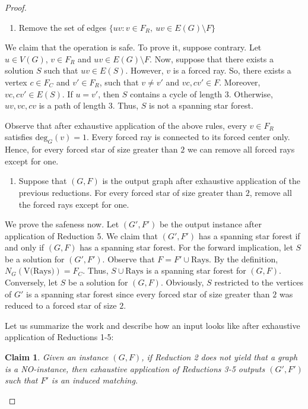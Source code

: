 \documentclass[en]{pracamgr}
\newtheorem{claim}{Claim}
\theoremstyle{definition}
\newcommand{\ssf}{spanning star forest}
\newcommand{\degree}[2]{\textrm{deg}_{#1}(#2)}
\begin{document}
\begin{proof}
	\begin{enumerate}[leftmargin=*,label=\textbf{Reduction \arabic{enumi}},resume,wide, labelwidth=!, labelindent=0pt]
		\item Remove the set of edges $\{uv: v \in F_R,\ uv \in E(G) \setminus F\}$
	\end{enumerate}
	We claim that the operation is safe. To prove it, suppose contrary. Let $u \in V(G)$, $v \in F_R$ and $uv \in E(G) \setminus F$. Now, suppose that there exists a solution $S$ such that $uv \in E(S)$. However, $v$ is a forced ray. So, there exists a vertex $c \in F_C$ and $v' \in F_R$, such that $v \neq v'$ and $vc,cv' \in F$. Moreover, $vc,cv' \in E(S)$. If $u=v'$, then $S$ contains a cycle of length $3$. Otherwise, $uv,vc,cv$ is a path of length $3$. Thus, $S$ is not a spanning star forest.

	Observe that after exhaustive application of the above rules, every $v \in F_R$ satisfies $\degree{G}{v}=1$. Every forced ray is connected to its forced center only. Hence, for every forced star of size greater than $2$ we can remove all forced rays except for one.


	\begin{enumerate}[leftmargin=*,label=\textbf{Reduction \arabic{enumi}},resume,wide, labelwidth=!, labelindent=0pt]
		\item Suppose that $(G,F)$ is the output graph after exhaustive application of the previous reductions. For every forced star of size greater than $2$, remove all the forced rays except for one.
	\end{enumerate}

	We prove the safeness now. Let $(G',F')$ be the output instance after application of Reduction 5. We claim that $(G',F')$ has a \ssf{} if and only if $(G,F)$ has a \ssf{}. For the forward implication, let $S$ be a solution for $(G',F')$. Observe that $F = F' \cup \textrm{Rays}$. By the definition, $N_G(\textrm{V(Rays)}) = F_C$. Thus, $S \cup \textrm{Rays}$ is a \ssf{} for $(G,F)$. Conversely, let $S$ be a solution for $(G,F)$. Obviously, $S$ restricted to the vertices of $G'$ is a spanning star forest since every forced star of size greater than $2$ was reduced to a forced star of size $2$.

	Let us summarize the work and describe how an input looks like after exhaustive application of Reductions 1-5:

	\begin{claim}
		Given an instance $(G,F)$, if Reduction 2 does not yield that a graph is a NO-instance, then exhaustive application of Reductions 3-5 outputs $(G',F')$ such that $F'$ is an induced matching.
	\end{claim}
	

\end{proof}
\end{document}
